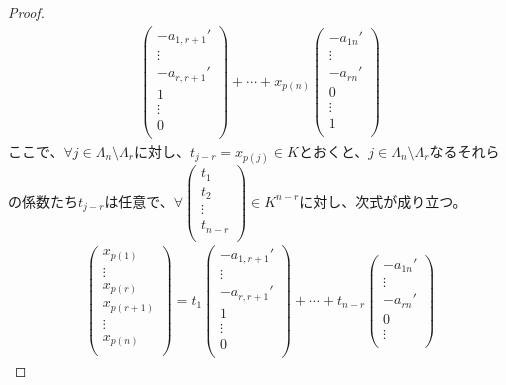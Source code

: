 \documentclass[dvipdfmx]{jsarticle}
\begin{document}
\begin{proof}
\begin{align*}
\begin{pmatrix}
 - a_{1,r + 1}' \\
 \vdots \\
 - a_{r,r + 1}' \\
1 \\
 \vdots \\
0 \\
\end{pmatrix} + \cdots + x_{p(n)}\begin{pmatrix}
 - a_{1n}' \\
 \vdots \\
 - a_{rn}' \\
0 \\
 \vdots \\
1 \\
\end{pmatrix}
\end{align*}
ここで、$\forall j \in \varLambda_{n} \setminus \varLambda_{r}$に対し、$t_{j - r} = x_{p(j)} \in K$とおくと、$j \in \varLambda_{n} \setminus \varLambda_{r}$なるそれらの係数たち$t_{j - r}$は任意で、$\forall\begin{pmatrix}
t_{1} \\
t_{2} \\
 \vdots \\
t_{n - r} \\
\end{pmatrix} \in K^{n - r}$に対し、次式が成り立つ。
\begin{align*}
\begin{pmatrix}
x_{p(1)} \\
 \vdots \\
x_{p(r)} \\
x_{p(r + 1)} \\
 \vdots \\
x_{p(n)} \\
\end{pmatrix} = t_{1}\begin{pmatrix}
 - a_{1,r + 1}' \\
 \vdots \\
 - a_{r,r + 1}' \\
1 \\
 \vdots \\
0 \\
\end{pmatrix} + \cdots + t_{n - r}\begin{pmatrix}
 - a_{1n}' \\
 \vdots \\
 - a_{rn}' \\
0 \\
 \vdots \\

\end{pmatrix}
\end{align*}
\end{proof}
\end{document}
